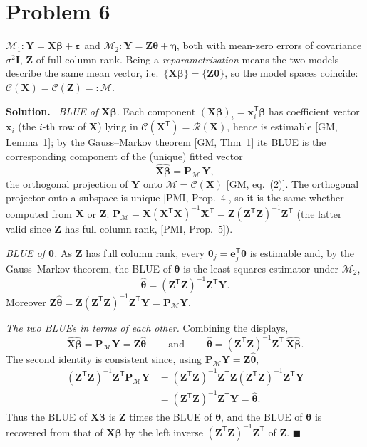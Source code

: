 \documentclass[11pt]{article}
\newcommand{\Cs}{\mathcal{C}}
\newcommand{\bX}{\mathbf{X}}
\newcommand{\bY}{\mathbf{Y}}
\newcommand{\bZ}{\mathbf{Z}}
\newcommand{\bI}{\mathbf{I}}
\newcommand{\bP}{\mathbf{P}}
\newcommand{\bx}{\mathbf{x}}
\newcommand{\bbeta}{\bm{\beta}}
\newcommand{\btheta}{\bm{\theta}}
\newcommand{\beps}{\bm{\varepsilon}}
\newcommand{\beeta}{\bm{\eta}}
\newcommand{\T}{^{\mathsf{T}}}
\newcommand{\inv}{^{-1}}
\newcommand{\bhat}[1]{\widehat{#1}}
\theoremstyle{remark}
\newcommand{\ans}{\medskip\noindent\textbf{Solution.}\ }
\begin{document}
\section*{Problem 6}

$\mathcal M_1:\bY=\bX\bbeta+\beps$ and $\mathcal M_2:\bY=\bZ\btheta+\beeta$, both with mean-zero errors of
covariance $\sigma^2\bI$, $\bZ$ of full column rank. Being a \emph{reparametrisation} means the two models
describe the same mean vector, i.e.\ $\{\bX\bbeta\}=\{\bZ\btheta\}$, so the model spaces coincide:
$\Cs(\bX)=\Cs(\bZ)=:\mathcal M$.

\ans
\emph{BLUE of $\bX\bbeta$.} Each component $(\bX\bbeta)_i=\bx_i\T\bbeta$ has coefficient vector $\bx_i$ (the
$i$-th row of $\bX$) lying in $\Cs(\bX\T)=\mathcal R(\bX)$, hence is estimable [GM, Lemma~1]; by the
Gauss--Markov theorem [GM, Thm~1] its BLUE is the corresponding component of the (unique) fitted vector
\[
\widehat{\bX\bbeta}=\bP_{\!\mathcal M}\,\bY,
\]
the orthogonal projection of $\bY$ onto $\mathcal M=\Cs(\bX)$ [GM, eq.~(2)]. The orthogonal projector onto a
subspace is unique [PMI, Prop.~4], so it is the same whether computed from $\bX$ or $\bZ$:
$\bP_{\!\mathcal M}=\bX(\bX\T\bX)\inv\bX\T=\bZ(\bZ\T\bZ)\inv\bZ\T$ (the latter valid since $\bZ$ has full
column rank, [PMI, Prop.~5]).

\emph{BLUE of $\btheta$.} As $\bZ$ has full column rank, every $\btheta_j=\mathbf e_j\T\btheta$ is estimable
and, by the Gauss--Markov theorem, the BLUE of $\btheta$ is the least-squares estimator under $\mathcal M_2$,
\[
\bhat\btheta=(\bZ\T\bZ)\inv\bZ\T\bY .
\]
Moreover $\bZ\bhat\btheta=\bZ(\bZ\T\bZ)\inv\bZ\T\bY=\bP_{\!\mathcal M}\bY$.

\emph{The two BLUEs in terms of each other.} Combining the displays,
\[
\boxed{\ \widehat{\bX\bbeta}=\bP_{\!\mathcal M}\bY=\bZ\bhat\btheta\ }
\qquad\text{and}\qquad
\boxed{\ \bhat\btheta=(\bZ\T\bZ)\inv\bZ\T\,\widehat{\bX\bbeta}.\ }
\]
The second identity is consistent since, using $\bP_{\!\mathcal M}\bY=\bZ\bhat\btheta$,
\begin{align*}
(\bZ\T\bZ)\inv\bZ\T\bP_{\!\mathcal M}\bY
&=(\bZ\T\bZ)\inv\bZ\T\bZ(\bZ\T\bZ)\inv\bZ\T\bY\\
&=(\bZ\T\bZ)\inv\bZ\T\bY=\bhat\btheta.
\end{align*}
Thus the BLUE of $\bX\bbeta$ is $\bZ$ times the
BLUE of $\btheta$, and the BLUE of $\btheta$ is recovered from that of $\bX\bbeta$ by the left inverse
$(\bZ\T\bZ)\inv\bZ\T$ of $\bZ$. \hfill$\blacksquare$
\end{document}
